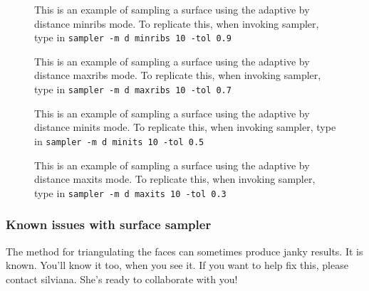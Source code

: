 \begin{figure}[!htb]\centering
     \caption{This is an example of sampling a surface using the adaptive by distance minribs mode. To replicate this, when invoking sampler, type in {\tt sampler -m d minribs 10 -tol 0.9}}
\end{figure}

\begin{figure}[!htb]\centering
     \caption{This is an example of sampling a surface using the adaptive by distance maxribs mode. To replicate this, when invoking sampler, type in {\tt sampler -m d maxribs 10 -tol 0.7}}
\end{figure}


\begin{figure}[!htb]\centering
     \caption{This is an example of sampling a surface using the adaptive by distance minits mode. To replicate this, when invoking sampler, type in {\tt sampler -m d minits 10 -tol 0.5}}
\end{figure}


\begin{figure}[!htb]\centering
     \caption{This is an example of sampling a surface using the adaptive by distance maxits mode. To replicate this, when invoking sampler, type in {\tt sampler -m d maxits 10 -tol 0.3}}
\end{figure}





\subsubsection{Known issues with surface sampler}

The method for triangulating the faces can sometimes produce janky results.  It is known.   You'll know it too, when you see it.  If you want to help fix this, please contact silviana.  She's ready to collaborate with you!

